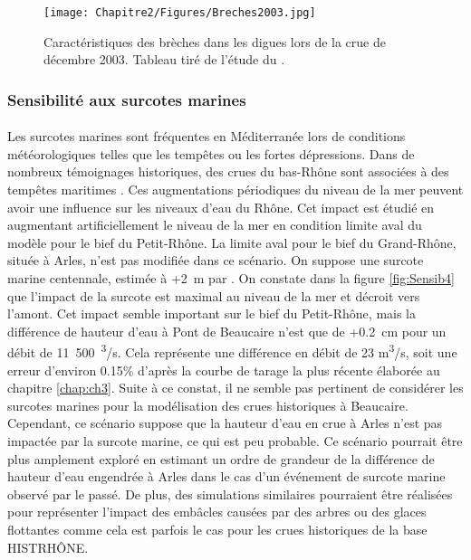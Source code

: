 	\begin{figure}[h]
		\centering
		\texttt{[image: Chapitre2/Figures/Breches2003.jpg]}
        \caption{Caractéristiques des brèches dans les digues lors de la crue de décembre 2003. Tableau tiré de l'étude du \citet{symadrem_programme_2012}.}
		\label{fig:Breches2003}
	\end{figure}		

\FloatBarrier	
	
	\subsubsection{Sensibilité aux surcotes marines}	
	
	\paragraph{} Les surcotes marines sont fréquentes en Méditerranée lors de conditions météorologiques telles que les tempêtes ou les fortes dépressions. Dans de nombreux témoignages historiques, des crues du bas-Rhône sont associées à des tempêtes maritimes \citet{pichard_sept_2014}. Ces augmentations périodiques du niveau de la mer peuvent avoir une influence sur les niveaux d'eau du Rhône. Cet impact est étudié en augmentant artificiellement le niveau de la mer en condition limite aval du modèle pour le bief du Petit-Rhône. La limite aval pour le bief du Grand-Rhône, située à Arles, n'est pas modifiée dans ce scénario. On suppose une surcote marine centennale, estimée à +2~m par \citet{kergadallan_estimation_2015}. On constate dans la figure \ref{fig:Sensib4} que l'impact de la surcote est maximal au niveau de la mer et décroit vers l'amont. Cet impact semble important sur le bief du Petit-Rhône, mais la différence de hauteur d'eau à Pont de Beaucaire n'est que de +0.2~cm pour un débit de 11~500~\textsuperscript{3}/s. Cela représente une différence en débit de 23 m\textsuperscript{3}/s, soit une erreur d'environ 0.15\% d'après la courbe de tarage la plus récente élaborée au chapitre \ref{chap:ch3}. Suite à ce constat, il ne semble pas pertinent de considérer les surcotes marines pour la modélisation des crues historiques à Beaucaire. Cependant, ce scénario suppose que la hauteur d'eau en crue à Arles n'est pas impactée par la surcote marine, ce qui est peu probable. Ce scénario pourrait être plus amplement exploré en estimant un ordre de grandeur de la différence de hauteur d'eau engendrée à Arles dans le cas d'un événement de surcote marine observé par le passé. De plus, des simulations similaires pourraient être réalisées pour représenter l'impact des embâcles causées par des arbres ou des glaces flottantes comme cela est parfois le cas pour les crues historiques de la base HISTRHÔNE.
	\FloatBarrier
